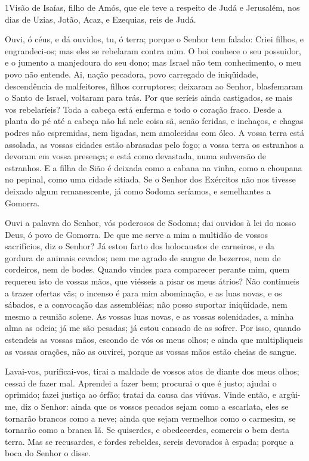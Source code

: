 
\lettrine{1}{}Visão de Isaías, filho de Amós, que ele teve a
respeito de Judá e Jerusalém, nos dias de Uzias, Jotão, Acaz, e
Ezequias, reis de Judá.

Ouvi, ó céus, e dá ouvidos, tu, ó terra; porque o Senhor tem
falado: Criei filhos, e engrandeci-os; mas eles se rebelaram contra
mim. O boi conhece o seu possuidor, e o jumento a manjedoura do
seu dono; mas Israel não tem conhecimento, o meu povo não entende.
Ai, nação pecadora, povo carregado de iniqüidade, descendência
de malfeitores, filhos corruptores; deixaram ao Senhor, blasfemaram
o Santo de Israel, voltaram para trás. Por que seríeis ainda
castigados, se mais vos rebelaríeis? Toda a cabeça está enferma e
todo o coração fraco. Desde a planta do pé até a cabeça não há
nele coisa sã, senão feridas, e inchaços, e chagas podres não
espremidas, nem ligadas, nem amolecidas com óleo. A vossa terra
está assolada, as vossas cidades estão abrasadas pelo fogo; a vossa
terra os estranhos a devoram em vossa presença; e está como
devastada, numa subversão de estranhos. E a filha de Sião é
deixada como a cabana na vinha, como a choupana no pepinal, como uma
cidade sitiada. Se o Senhor dos Exércitos não nos tivesse
deixado algum remanescente, já como Sodoma seríamos, e semelhantes a
Gomorra.

Ouvi a palavra do Senhor, vós poderosos de Sodoma; dai ouvidos à
lei do nosso Deus, ó povo de Gomorra. De que me serve a mim a
multidão de vossos sacrifícios, diz o Senhor? Já estou farto dos
holocaustos de carneiros, e da gordura de animais cevados; nem me
agrado de sangue de bezerros, nem de cordeiros, nem de bodes.
Quando vindes para comparecer perante mim, quem requereu isto
de vossas mãos, que viésseis a pisar os meus átrios? Não
continueis a trazer ofertas vãs; o incenso é para mim abominação, e
as luas novas, e os sábados, e a convocação das assembléias; não
posso suportar iniqüidade, nem mesmo a reunião solene. As
vossas luas novas, e as vossas solenidades, a minha alma as odeia;
já me são pesadas; já estou cansado de as sofrer. Por isso,
quando estendeis as vossas mãos, escondo de vós os meus olhos; e
ainda que multipliqueis as vossas orações, não as ouvirei, porque as
vossas mãos estão cheias de sangue.

Lavai-vos, purificai-vos, tirai a maldade de vossos atos de
diante dos meus olhos; cessai de fazer mal. Aprendei a fazer
bem; procurai o que é justo; ajudai o oprimido; fazei justiça ao
órfão; tratai da causa das viúvas. Vinde então, e argüi-me,
diz o Senhor: ainda que os vossos pecados sejam como a escarlata,
eles se tornarão brancos como a neve; ainda que sejam vermelhos como
o carmesim, se tornarão como a branca lã. Se quiserdes, e
obedecerdes, comereis o bem desta terra. Mas se recusardes, e
fordes rebeldes, sereis devorados à espada; porque a boca do Senhor
o disse.

